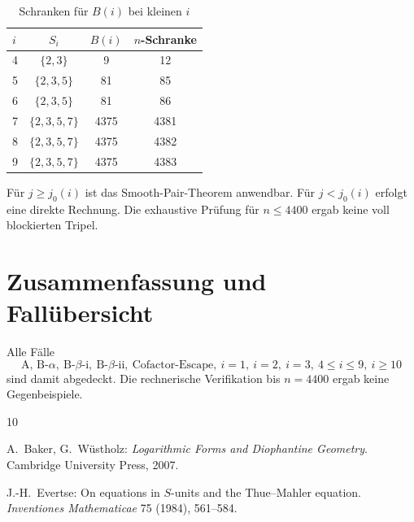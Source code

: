 \documentclass[12pt,a4paper]{article}
\theoremstyle{plain}
\theoremstyle{definition}
\theoremstyle{remark}
\begin{document}
	\begin{table}[ht]
		\centering
		\begin{tabular}{lccc}
			\toprule
			$i$ & $S_i$ & $B(i)$ & $n$-Schranke \\
			\midrule
			4 & $\{2,3\}$       & 9    & 12   \\
			5 & $\{2,3,5\}$     & 81   & 85   \\
			6 & $\{2,3,5\}$     & 81   & 86   \\
			7 & $\{2,3,5,7\}$   & 4375 & 4381 \\
			8 & $\{2,3,5,7\}$   & 4375 & 4382 \\
			9 & $\{2,3,5,7\}$   & 4375 & 4383 \\
			\bottomrule
		\end{tabular}
		\caption{Schranken für $B(i)$ bei kleinen $i$}
	\end{table}
	
	Für $j \geq j_0(i)$ ist das Smooth-Pair-Theorem anwendbar. Für $j < j_0(i)$ erfolgt eine direkte Rechnung. Die exhaustive Prüfung für $n \leq 4400$ ergab keine voll blockierten Tripel.
	
	\section{Zusammenfassung und Fallübersicht}
	
	Alle Fälle
	\[
	\text{A,\ B-}\alpha,\ \text{B-}\beta\text{-i},\ \text{B-}\beta\text{-ii},\ \text{Cofactor-Escape},\ i=1,\ i=2,\ i=3,\ 4\leq i\leq 9,\ i\geq 10
	\]
	sind damit abgedeckt. Die rechnerische Verifikation bis $n=4400$ ergab keine Gegenbeispiele.
	
	\begin{thebibliography}{10}
		
		A.~Baker, G.~Wüstholz:
		\emph{Logarithmic Forms and Diophantine Geometry}.
		Cambridge University Press, 2007.
		
		J.-H.~Evertse:
		On equations in $S$-units and the Thue--Mahler equation.
		\emph{Inventiones Mathematicae} 75 (1984), 561--584.
		
	\end{thebibliography}
	
\end{document}
